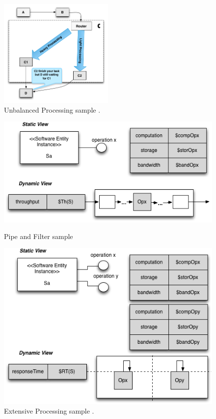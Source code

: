 \documentclass[times]{stvrauth}
\begin{document}
\begin{figure}[h]
\centering
\includegraphics[width=0.5\textwidth]{./images/unbalanced.png}
\caption{Unbalanced Processing sample \cite{Wert2013a}. }
\label{fig:unbalanced}
\end{figure}


\begin{figure}[h]
\begin{minipage}{.5\textwidth}
\centering
\includegraphics[width=1\textwidth]{./images/pipe2.png}
\caption{Pipe and Filter sample \cite{Vetoio2011}}
\label{fig:pipefilter}
\end{minipage}
\begin{minipage}{.5\textwidth}
\centering
\includegraphics[width=1\textwidth]{./images/extpro.png}
\caption{Extensive Processing sample \cite{Vetoio2011}.}
\label{fig:extpro}
\end{minipage}
\end{figure}
\end{document}

